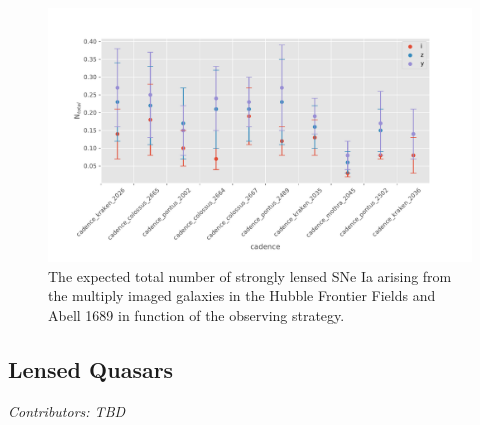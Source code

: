 \begin{figure}
\centering
\includegraphics[scale=0.65]{figures/sl_galaxy_lensing.pdf}\caption{The expected total number of strongly lensed SNe Ia arising from the multiply imaged galaxies in the Hubble Frontier Fields and Abell 1689 in function of the observing strategy. }
\end{figure}


\subsection{Lensed Quasars}
\textit{Contributors: TBD}
